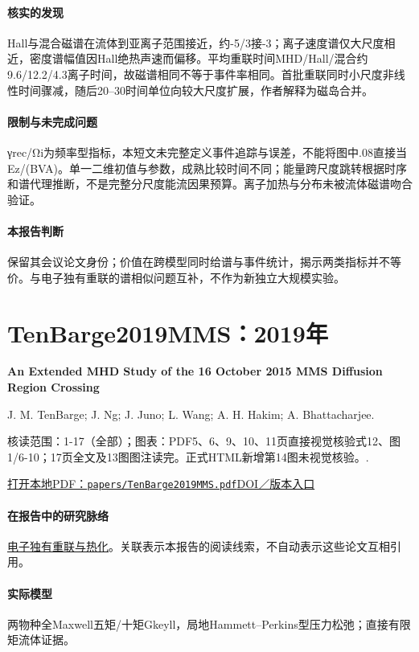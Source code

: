 \documentclass[UTF8,a4paper,11pt,openany,fontset=fandol]{ctexbook}
\begin{document}
\paragraph{核实的发现}Hall与混合磁谱在流体到亚离子范围接近，约-5/3接-3；离子速度谱仅大尺度相近，密度谱幅值因Hall绝热声速而偏移。平均重联时间MHD/Hall/混合约9.6/12.2/4.3离子时间，故磁谱相同不等于事件率相同。首批重联同时小尺度非线性时间骤减，随后20–30时间单位向较大尺度扩展，作者解释为磁岛合并。

\paragraph{限制与未完成问题}γrec/Ωi为频率型指标，本短文未完整定义事件追踪与误差，不能将图中.08直接当Ez/(BVA)。单一二维初值与参数，成熟比较时间不同；能量跨尺度跳转根据时序和谱代理推断，不是完整分尺度能流因果预算。离子加热与分布未被流体磁谱吻合验证。

\paragraph{本报告判断}保留其会议论文身份；价值在跨模型同时给谱与事件统计，揭示两类指标并不等价。与电子独有重联的谱相似问题互补，不作为新独立大规模实验。

\section{TenBarge2019MMS：2019年}\label{paper:TenBarge2019MMS}

\textbf{An Extended MHD Study of the 16 October 2015 MMS Diffusion Region Crossing}\citep{TenBarge2019MMS}\

J. M. TenBarge;  J. Ng;  J. Juno;  L. Wang;  A. H. Hakim;  A. Bhattacharjee.

\textsf{核读范围：}1-17（全部）；\textsf{图表：}PDF5、6、9、10、11页直接视觉核验式12、图1/6-10；17页全文及13图图注读完。正式HTML新增第14图未视觉核验。.

\href{run:../papers/TenBarge2019MMS.pdf}{打开本地PDF：\texttt{papers/TenBarge2019MMS.pdf}}\quad\href{https://doi.org/10.1029/2019JA026731}{DOI／版本入口}

\paragraph{在报告中的研究脉络}\hyperref[story:energy]{电子独有重联与热化}。关联表示本报告的阅读线索，不自动表示这些论文互相引用。

\paragraph{实际模型}两物种全Maxwell五矩/十矩Gkeyll，局地Hammett–Perkins型压力松弛；直接有限矩流体证据。
\end{document}
